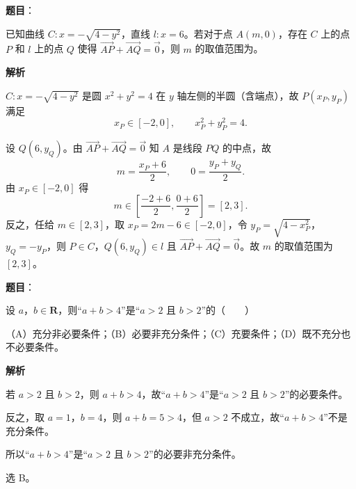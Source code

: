\begin{answer}

\textbf{题目}：

已知曲线 $C:x=-\sqrt{4-y^2}$，直线 $l:x=6$。若对于点 $A(m,0)$，存在 $C$ 上的点 $P$ 和 $l$ 上的点 $Q$ 使得 $\overrightarrow{AP}+\overrightarrow{AQ}=\vec{0}$，则 $m$ 的取值范围为\gkblank{}。

\textbf{解析}

$C:x=-\sqrt{4-y^2}$ 是圆 $x^2+y^2=4$ 在 $y$ 轴左侧的半圆（含端点），故 $P(x_P,y_P)$ 满足
\nopagebreak[4]
\[x_P\in[-2,0],\qquad x_P^2+y_P^2=4 .\]

设 $Q(6,y_Q)$。由 $\overrightarrow{AP}+\overrightarrow{AQ}=\vec{0}$ 知 $A$ 是线段 $PQ$ 的中点，故
\nopagebreak[4]
\[m=\frac{x_P+6}{2},\qquad 0=\frac{y_P+y_Q}{2}.\]
由 $x_P\in[-2,0]$ 得
\nopagebreak[4]
\[m\in\left[\frac{-2+6}2,\frac{0+6}2\right]=[2,3].\]
反之，任给 $m\in[2,3]$，取 $x_P=2m-6\in[-2,0]$，令 $y_P=\sqrt{4-x_P^2}$，$y_Q=-y_P$，则 $P\in C$，$Q(6,y_Q)\in l$ 且 $\overrightarrow{AP}+\overrightarrow{AQ}=\vec{0}$。故 $m$ 的取值范围为 $[2,3]$。


\end{answer}
\begin{answer}

\textbf{题目}：

设 $a$，$b\in\mathbf R$，则“$a+b>4$”是“$a>2$ 且 $b>2$”的\mbox{（　　）}

（A）充分非必要条件；（B）必要非充分条件；（C）充要条件；（D）既不充分也不必要条件。

\textbf{解析}

若 $a>2$ 且 $b>2$，则 $a+b>4$，故“$a+b>4$”是“$a>2$ 且 $b>2$”的必要条件。

反之，取 $a=1$，$b=4$，则 $a+b=5>4$，但 $a>2$ 不成立，故“$a+b>4$”不是充分条件。

所以“$a+b>4$”是“$a>2$ 且 $b>2$”的必要非充分条件。

选 B。


\end{answer}
